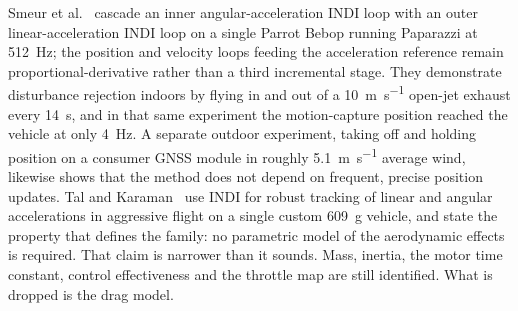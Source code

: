 Smeur et al.~\cite{smeur2017cascadedindi} cascade an inner angular-acceleration INDI loop with an
outer linear-acceleration INDI loop on a single Parrot Bebop running Paparazzi at
\SI{512}{\hertz}; the position and velocity loops feeding the acceleration reference remain
proportional-derivative rather than a third incremental stage. They demonstrate disturbance
rejection indoors by flying in and out of a \SI{10}{\metre\per\second} open-jet exhaust every
\SI{14}{\second}, and in that same experiment the motion-capture position reached the vehicle at
only \SI{4}{\hertz}. A separate outdoor experiment, taking off and holding position on a consumer
GNSS module in roughly \SI{5.1}{\metre\per\second} average wind, likewise shows that the method
does not depend on frequent, precise position updates. Tal and Karaman~\cite{tal2018indi} use INDI for robust tracking of
linear and angular accelerations in aggressive flight on a single custom \SI{609}{\gram} vehicle,
and state the property that defines the family: no parametric model of the aerodynamic effects is
required. That claim is narrower than it sounds. Mass, inertia, the motor time constant, control
effectiveness and the throttle map are still identified. What is dropped is the drag model.

